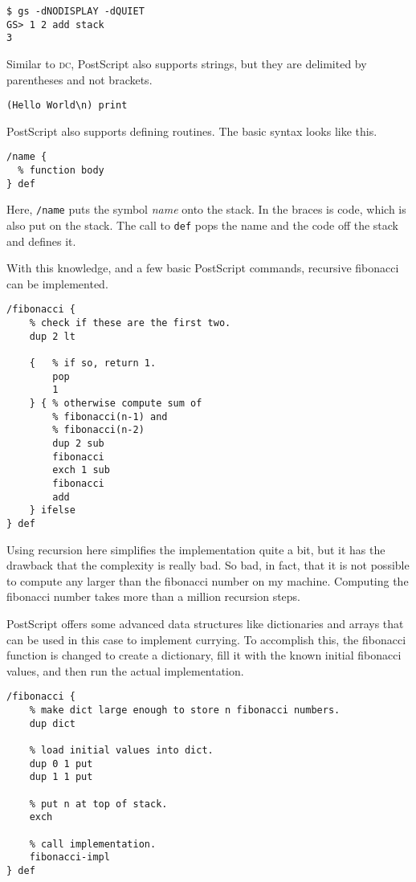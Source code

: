\documentclass[a4paper,twocolumn]{article}
\begin{document}
\begin{verbatim}
$ gs -dNODISPLAY -dQUIET
GS> 1 2 add stack
3
\end{verbatim}

Similar to \textsc{dc}, PostScript also supports strings\cite{bluebook1985}, but they are delimited by parentheses and not brackets. 

\begin{verbatim}
(Hello World\n) print  
\end{verbatim}

PostScript also supports defining routines. The basic syntax looks like this.

\begin{verbatim}
/name {
  % function body
} def
\end{verbatim}

Here, \verb|/name| puts the symbol \emph{name} onto the stack. In the braces is code, which is also put on the stack. The call to \verb|def| pops the name and the code off the stack and defines it.

With this knowledge, and a few basic PostScript commands, recursive fibonacci can be implemented.

\begin{verbatim}
/fibonacci {
    % check if these are the first two.
    dup 2 lt

    {   % if so, return 1.
        pop
        1
    } { % otherwise compute sum of
        % fibonacci(n-1) and 
        % fibonacci(n-2)
        dup 2 sub
        fibonacci
        exch 1 sub
        fibonacci
        add
    } ifelse
} def
\end{verbatim}

Using recursion here simplifies the implementation quite a bit, but it has the drawback that the complexity is really bad. So bad, in fact, that it is not possible to compute any larger than the  fibonacci number on my machine. Computing the  fibonacci number takes more than a million recursion steps.

PostScript offers some advanced data structures like dictionaries and arrays that can be used in this case to implement currying. To accomplish this, the fibonacci function is changed to create a dictionary, fill it with the known initial fibonacci values, and then run the actual implementation.

\begin{verbatim}
/fibonacci {
    % make dict large enough to store n fibonacci numbers.
    dup dict

    % load initial values into dict.
    dup 0 1 put
    dup 1 1 put

    % put n at top of stack.
    exch

    % call implementation.
    fibonacci-impl
} def
\end{verbatim}
\end{document}

